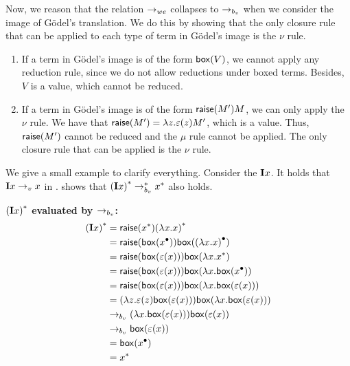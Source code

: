 Now, we reason that the relation $\to_{we}$ collapses to $\to_{b_v}$ when we consider the image of Gödel's translation.
We do this by showing that the only closure rule that can be applied to each type of term in Gödel's image is the $\nu$ rule.
\begin{enumerate}
  \item%
 If a term in Gödel's image is of the form $\mathsf{box}({V})$, we cannot apply any reduction rule,
 since we do not allow reductions under boxed terms. Besides, $V$ is a value, which cannot be reduced.
  \item%
 If a term in Gödel's image is of the form $\textsf{raise}({M'}) M$, we can only apply the $\nu$ rule.
 We have that $\textsf{raise}({M'}) = \lambda {z}.{\varepsilon(z)M'}$, which is a value. 
 Thus, $\textsf{raise}({M'})$ cannot be reduced and the $\mu$ rule cannot be applied.
 The only closure rule that can be applied is the $\nu$ rule.
\end{enumerate}

We give a small example to clarify everything. Consider the \lterm $\mathbf{I} x$. It holds that $\mathbf{I} x \to_v x$ in \lan. 
 shows that ${(\mathbf{I} x)}^* \to_{b_v}^* {x}^*$ also holds.



\begin{example}
  \label{ex:gödel-translation-bv}
  \textbf{\boldmath${{(\mathbf{I} x)}^*}$ evaluated by $\to_{b_v}$:}
  \begin{align*}
 {(\mathbf{I}x)}^* &= \textsf{raise}({{x}^*}) {(\lambda {x}.{x})}^*  \\
                    &= \textsf{raise}({\mathsf{box}({{x}^\bullet})}) \mathsf{box}({{(\lambda {x}.{x})}^\bullet})  \\
                    &= \textsf{raise}({\mathsf{box}({\varepsilon(x)})}) \mathsf{box}({\lambda {x}.{{x}^*}}) \\
                    &= \textsf{raise}({\mathsf{box}({\varepsilon(x)})}) \mathsf{box}({\lambda {x}.{\mathsf{box}({{x}^\bullet})}}) \\
                    &= \textsf{raise}({\mathsf{box}({\varepsilon(x)})}) \mathsf{box}({\lambda {x}.{\mathsf{box}({\varepsilon(x)})}}) \\
                    &= (\lambda {z}.{\varepsilon(z)\mathsf{box}({\varepsilon(x)})}) \mathsf{box}({\lambda {x}.{\mathsf{box}({\varepsilon(x)})}}) \\
                    &\to_{b_v} (\lambda {x}.{\mathsf{box}({\varepsilon(x)})})\mathsf{box}({\varepsilon(x)}) \\
                    &\to_{b_v} \mathsf{box}({\varepsilon(x)}) \\
                    &= \mathsf{box}({{x}^\bullet}) \\
                    &= {x}^*
  \end{align*}
\end{example}

